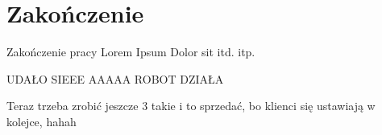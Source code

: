 
\chapter{Zakończenie}

Zakończenie pracy
Lorem Ipsum Dolor sit itd. itp.

UDAŁO SIEEE
AAAAA
ROBOT DZIAŁA

Teraz trzeba zrobić jeszcze 3  takie i to sprzedać, bo klienci się ustawiają w kolejce, hahah
